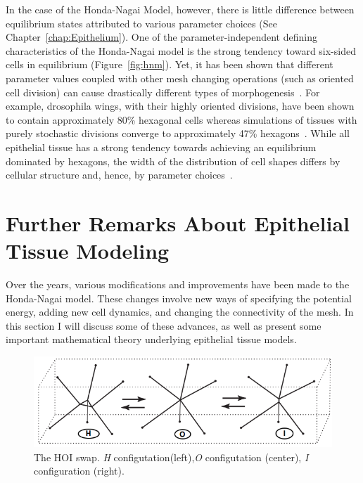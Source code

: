 In the case of the Honda-Nagai Model, however, there is little difference between equilibrium states attributed to various parameter choices (See Chapter~\ref{chap:Epithelium}). One of the parameter-independent defining characteristics of the Honda-Nagai model is the strong tendency toward six-sided cells in equilibrium (Figure~\ref{fig:hnm}).  Yet, it has been shown that different parameter values coupled with other mesh changing operations (such as oriented cell division) can cause drastically different types of morphogenesis~\cite{Overview}. For example, drosophila wings, with their highly oriented divisions, have been shown to contain approximately 80\% hexagonal cells whereas simulations of tissues with purely stochastic divisions converge to  approximately 47\% hexagons~\cite{EpithelialTopology}. While all epithelial tissue has a strong tendency towards achieving an equilibrium dominated by hexagons, the width of the distribution of cell shapes differs by cellular structure and, hence, by parameter choices~\cite{Soap}. 


\section{Further Remarks About Epithelial Tissue Modeling}
Over the years, various modifications and improvements have been made to the Honda-Nagai model. These changes involve new ways of specifying the potential energy, adding new cell dynamics, and changing the connectivity of the mesh. In this section I will discuss some of these advances, as well as present some important mathematical theory underlying epithelial tissue models.


\begin{figure}
\centering
\includegraphics[width=\textwidth]{../diagrams/hoi.png}
\caption[The HOI swap.]{The HOI swap. \emph{H} configutation(left),\emph{O} configutation (center), \emph{I} configuration (right).}
\label{fig:hoi}
\end{figure}

